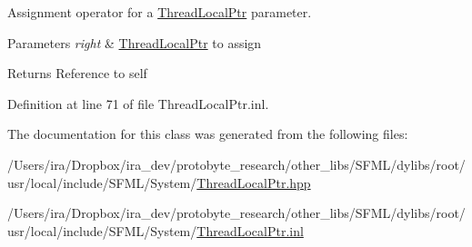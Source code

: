 Assignment operator for a \hyperlink{classsf_1_1_thread_local_ptr}{Thread\-Local\-Ptr} parameter. 


\begin{DoxyParams}{Parameters}
{\em right} & \hyperlink{classsf_1_1_thread_local_ptr}{Thread\-Local\-Ptr} to assign\\
\hline
\end{DoxyParams}
\begin{DoxyReturn}{Returns}
Reference to self 
\end{DoxyReturn}


Definition at line 71 of file Thread\-Local\-Ptr.\-inl.



The documentation for this class was generated from the following files\-:\begin{DoxyCompactItemize}
\item 
/\-Users/ira/\-Dropbox/ira\-\_\-dev/protobyte\-\_\-research/other\-\_\-libs/\-S\-F\-M\-L/dylibs/root/usr/local/include/\-S\-F\-M\-L/\-System/\hyperlink{_thread_local_ptr_8hpp}{Thread\-Local\-Ptr.\-hpp}\item 
/\-Users/ira/\-Dropbox/ira\-\_\-dev/protobyte\-\_\-research/other\-\_\-libs/\-S\-F\-M\-L/dylibs/root/usr/local/include/\-S\-F\-M\-L/\-System/\hyperlink{_thread_local_ptr_8inl}{Thread\-Local\-Ptr.\-inl}\end{DoxyCompactItemize}
